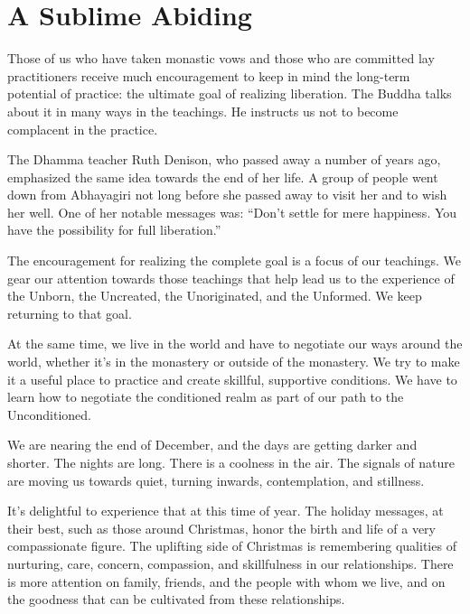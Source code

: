 
\chapter{A Sublime Abiding}

Those of us who have taken monastic vows and those who are committed lay practitioners receive much encouragement to keep in mind the long-term potential of practice: the ultimate goal of realizing liberation. The Buddha talks about it in many ways in the teachings. He instructs us not to become complacent in the practice.

The Dhamma teacher Ruth Denison, who passed away a number of years ago, emphasized the same idea towards the end of her life. A group of people went down from Abhayagiri not long before she passed away to visit her and to wish her well. One of her notable messages was: ``Don't settle for mere happiness. You have the possibility for full liberation.''

The encouragement for realizing the complete goal is a focus of our teachings. We gear our attention towards those teachings that help lead us to the experience of the Unborn, the Uncreated, the Unoriginated, and the Unformed. We keep returning to that goal.

At the same time, we live in the world and have to negotiate our ways around the world, whether it's in the monastery or outside of the monastery. We try to make it a useful place to practice and create skillful, supportive conditions. We have to learn how to negotiate the conditioned realm as part of our path to the Unconditioned.

We are nearing the end of December, and the days are getting darker and shorter. The nights are long. There is a coolness in the air. The signals of nature are moving us towards quiet, turning inwards, contemplation, and stillness.

It's delightful to experience that at this time of year. The holiday messages, at their best, such as those around Christmas, honor the birth and life of a very compassionate figure. The uplifting side of Christmas is remembering qualities of nurturing, care, concern, compassion, and skillfulness in our relationships. There is more attention on family, friends, and the people with whom we live, and on the goodness that can be cultivated from these relationships.

